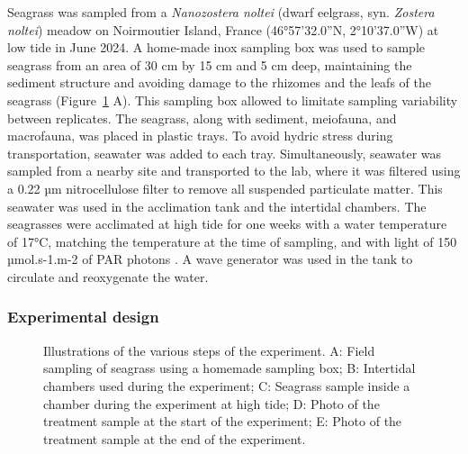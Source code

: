 \documentclass[
  number]{elsarticle}
\begin{document}
Seagrass was sampled from a \emph{Nanozostera noltei} (dwarf eelgrass,
syn. \emph{Zostera noltei}) meadow on Noirmoutier Island, France
(46°57'32.0''N, 2°10'37.0''W) at low tide in June 2024. A home-made inox
sampling box was used to sample seagrass from an area of 30 cm by 15 cm
and 5 cm deep, maintaining the sediment structure and avoiding damage to
the rhizomes and the leafs of the seagrass (Figure~\ref{fig-design} A).
This sampling box allowed to limitate sampling variability between
replicates. The seagrass, along with sediment, meiofauna, and
macrofauna, was placed in plastic trays. To avoid hydric stress during
transportation, seawater was added to each tray. Simultaneously,
seawater was sampled from a nearby site and transported to the lab,
where it was filtered using a 0.22 µm nitrocellulose filter to remove
all suspended particulate matter. This seawater was used in the
acclimation tank and the intertidal chambers. The seagrasses were
acclimated at high tide for one weeks with a water temperature of 17°C,
matching the temperature at the time of sampling, and with light of 150
µmol.s-1.m-2 of PAR photons \citep{akbar2020mangrove}. A wave generator
was used in the tank to circulate and reoxygenate the water.

\subsubsection{Experimental design}\label{experimental-design}

\label{cell-fig-design}
\begin{figure}[H]


\caption{\label{fig-design}Illustrations of the various steps of the
experiment. A: Field sampling of seagrass using a homemade sampling box;
B: Intertidal chambers used during the experiment; C: Seagrass sample
inside a chamber during the experiment at high tide; D: Photo of the
treatment sample at the start of the experiment; E: Photo of the
treatment sample at the end of the experiment.}

\end{figure}%
\end{document}
